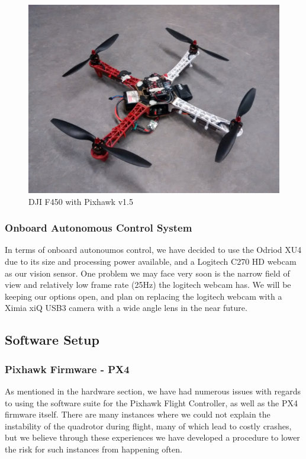 \documentclass[11pt, twocolumn]{article}
\begin{document}
\begin{figure}[H]
	\centering
	\includegraphics[width=0.8\linewidth]{images/quadrotor.jpg}
	\caption{DJI F450 with Pixhawk v1.5}
\end{figure}

\subsubsection{Onboard Autonomous Control System}
In terms of onboard autonoumos control, we have decided to use the Odriod XU4 due to its size and processing power available, and a Logitech C270 HD webcam as our vision sensor. One problem we may face very soon is the narrow field of view and relatively low frame rate (25Hz) the logitech webcam has. We will be keeping our options open, and plan on replacing the logitech webcam with a Ximia xiQ USB3 camera with a wide angle lens in the near future.



\subsection{Software Setup}
\subsubsection{Pixhawk Firmware - PX4}
As mentioned in the hardware section, we have had numerous issues with regards to using the software suite for the Pixhawk Flight Controller, as well as the PX4 firmware itself. There are many instances where we could not explain the instability of the quadrotor during flight, many of which lead to costly crashes, but we believe through these experiences we have developed a procedure to lower the risk for such instances from happening often.
\end{document}
